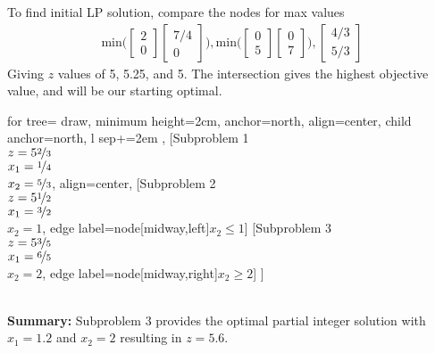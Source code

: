 \documentclass[answers]{exam}
\begin{document}
\begin{questions}
\begin{solution}
	To find initial LP solution, compare the nodes for max values
	\begin{align*}
		\text{min}
		\bigg(
		\begin{bmatrix} 2 \\ 0 \end{bmatrix}
		\begin{bmatrix} 7/4 \\ 0 \end{bmatrix}
		\bigg),
		\text{min}
		\bigg(
		\begin{bmatrix} 0 \\ 5 \end{bmatrix}
		\begin{bmatrix} 0 \\ 7 \end{bmatrix}
		\bigg),
		\begin{bmatrix} 4/3 \\ 5/3 \end{bmatrix}
	\end{align*}
	Giving $z$ values of 5, 5.25, and 5. 
	The intersection gives the highest objective value, 
	and will be our starting optimal.
	
	\begin{forest}
		for tree={
			draw,
			minimum height=2cm,
			anchor=north,
			align=center,
			child anchor=north,
			l sep+=2em
		},
		[{Subproblem 1 \\ 
			\(z=5\nicefrac{2}{3}\) \\ 
			\(x_1=\nicefrac{1}{4}\) \\ 
			\(x_2 = \nicefrac{5}{3}\)}, align=center,
			[{Subproblem 2\\ 
				\(z=5\nicefrac{1}{2}\) \\ 
				\(x_1=\nicefrac{3}{2}\) \\ 
				\(x_2 = 1\)}, edge label={node[midway,left]{$x_2\leq1$}}]
			[{Subproblem 3\\ 
				\(z=5\nicefrac{3}{5}\) \\ 
				\(x_1=\nicefrac{6}{5}\) \\ 
				\(x_2 = 2\)}, edge label={node[midway,right]{$x_2\geq2$}}]
		]
	\end{forest} \\
	\textbf{Summary: }
	Subproblem 3 provides the optimal partial integer solution with 
	\(x_1=1.2\) and \(x_2=2\) resulting in \(z=5.6\).
\end{solution}

\clearpage


\end{questions}
\end{document}
